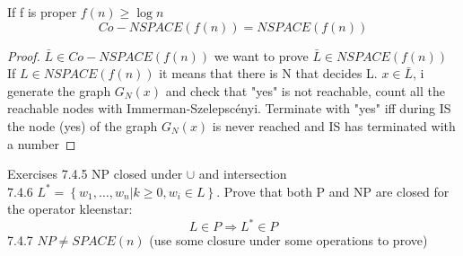 \begin{corollary}
    If f is proper $f(n) \geq \log{n}$ 
    \[ 
        Co-NSPACE(f(n)) = NSPACE(f(n)) 
    \]
    \begin{proof}
        $\bar{L} \in Co-NSPACE(f(n))$ we want to prove $\bar{L} \in NSPACE(f(n))$
        If $L \in NSPACE(f(n))$ it means that there is N that decides L. $x \in \bar{L}$, i generate the graph $G_N(x)$ and check that "yes" is not reachable, count all the reachable nodes with Immerman-Szelepscényi. Terminate with "yes" iff during IS the node (yes) of the graph $G_N(x)$ is never reached and IS has terminated with a number
    \end{proof}
\end{corollary}
Exercises
7.4.5 NP closed under $\cup$ and intersection\\
7.4.6 $L^* = \left\{ w_{1}, \ldots,w_{n} | k\geq 0 , w_i \in L \right\}$. Prove that both P and NP are closed for the operator kleenstar:
\[ 
    L \in P \Rightarrow L^* \in P 
\]
7.4.7 $NP \neq SPACE(n)$ (use some closure under some operations to prove)\\


